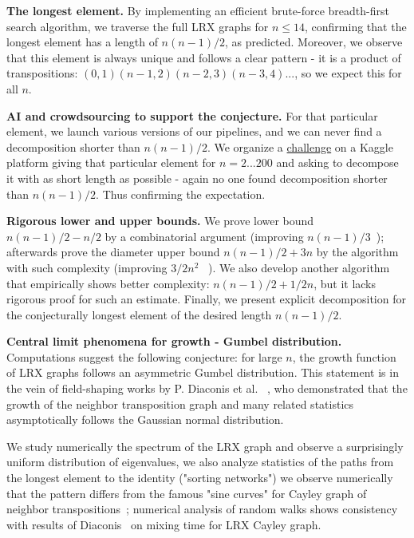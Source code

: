 \documentclass[atmp]{ipart_v1}
\numberwithin{equation}{section}
\theoremstyle{plain}%
\begin{document}
{\bf The longest element.} 
By implementing an efficient brute-force breadth-first search algorithm, we traverse the full LRX graphs for $n\le 14$, confirming that the longest element has a length of $n(n-1)/2$, as predicted. Moreover, we observe that this element is always unique and follows a clear pattern - it is a product of transpositions:  $(0,1)(n-1,2)(n-2,3)(n-3,4)...$,  so we expect this for all $n$.  
 
{\bf AI and crowdsourcing to support the conjecture.} For that particular element, we launch various versions of our pipelines, and we can never find a decomposition shorter than $n(n-1)/2$. We organize a \href{https://www.kaggle.com/competitions/lrx-oeis-a-186783-brainstorm-math-conjecture/overview}{challenge} on a Kaggle platform giving that particular element for $n=2...200$ and asking to decompose it with as short length as possible - again no one found decomposition shorter than $n(n-1)/2$. Thus confirming the expectation.

{\bf Rigorous lower and upper bounds.} We prove lower bound $n(n-1)/2 - n/2$  by a combinatorial argument (improving $n(n-1)/3$~\cite{babai1989small}); afterwards prove the diameter  upper bound $n(n-1)/2 +3n$ by the algorithm  with such complexity (improving $3/2n^2$ ~\cite{kuppili2020upper}). %
We also develop another algorithm that empirically shows better complexity:  $n(n-1)/2 + 1/2n$, but it lacks rigorous proof for such an estimate.  
Finally, we present explicit decomposition for the conjecturally longest element of the desired length $n(n-1)/2$. 

{\bf Central limit phenomena for growth - Gumbel distribution.} 
Computations suggest the following conjecture: for large 
$n$, the growth function of LRX graphs follows an asymmetric Gumbel distribution. This statement is in the vein of field-shaping works by P. Diaconis et al. ~\cite{diaconis1977spearman, diaconis1988metrics,chatterjee2017central}, who demonstrated that the growth of the neighbor transposition graph and many related statistics asymptotically follows the Gaussian normal distribution.

We study numerically the spectrum of the LRX graph and observe a surprisingly uniform distribution of eigenvalues, we also analyze statistics of the paths from the longest element to the identity ("sorting networks") we observe numerically that the pattern differs from the famous "sine curves" for Cayley graph of neighbor transpositions~\cite{angel2007random}; 
numerical analysis of random walks shows consistency with results of Diaconis~\cite{diaconis1993comparison} on mixing time for LRX Cayley graph. 
\end{document}
